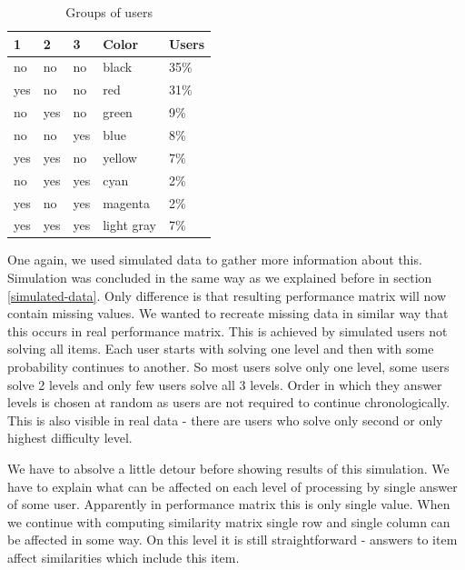 \documentclass[
  digital, %
  table,   %
  nolof,     %
  nolot,     %
  nocover
]{fithesis3}
\begin{document}
\begin{table}
  \begin{tabular}{ | l | l | l | l | l | }
    \hline
  	1   & 2   & 3   & Color      & Users \\ \hline
  	no  & no  & no  & black      & 35\%  \\ \hline
  	yes & no  & no  & red        & 31\%  \\ \hline
  	no  & yes & no  & green      & 9\%   \\ \hline
  	no  & no  & yes & blue       & 8\%   \\ \hline
  	yes & yes & no  & yellow     & 7\%   \\ \hline
  	no  & yes & yes & cyan       & 2\%   \\ \hline
  	yes & no  & yes & magenta    & 2\%   \\ \hline
  	yes & yes & yes & light gray & 7\%   \\ \hline
    \hline
  \end{tabular}
  \caption{Groups of users}
  \label{tab:user-groups}
\end{table}


One again, we used simulated data to gather more information about this. Simulation was concluded in the same way as we explained before in section \ref{simulated-data}. Only difference is that resulting performance matrix will now contain missing values. We wanted to recreate missing data in similar way that this occurs in real performance matrix. This is achieved by simulated users not solving all items. Each user starts with solving one level and then with some probability continues to another. So most users solve only one level, some users solve 2 levels and only few users solve all 3 levels. Order in which they answer levels is chosen at random as users are not required to continue chronologically. This is also visible in real data - there are users who solve only second or only highest difficulty level.



We have to absolve a little detour before showing results of this simulation. We have to explain what can be affected on each level of processing by single answer of some user. Apparently in performance matrix this is only single value. When we continue with computing similarity matrix single row and single column can be affected in some way. On this level it is still straightforward - answers to item affect similarities which include this item. 
\end{document}
